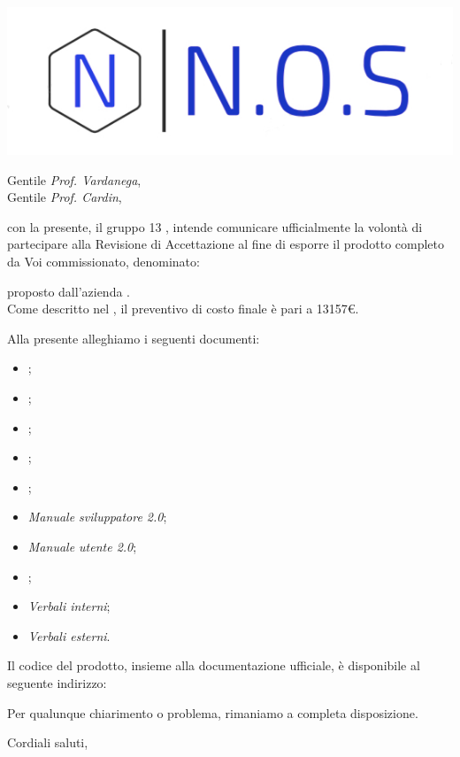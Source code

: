 \documentclass[12pt]{letter}
\date{26 maggio 2021}
\begin{document}
\begin{letter}{ }

\includegraphics[scale=1.5
]{../../../Immagini/N.O.S.jpg}

\opening{Gentile \textit{Prof. Vardanega},\\ Gentile \textit{Prof. Cardin},}

con la presente, il gruppo 13 {\Gruppo}, intende comunicare ufficialmente la volontà di partecipare alla Revisione di Accettazione al fine di esporre il prodotto completo da Voi commissionato, denominato:
\begin{center}
	\textbf{\NomeProgetto}
\end{center}
proposto dall'azienda \Proponente.\\
Come descritto nel , il preventivo di costo finale è pari a 13157\euro. 

Alla presente alleghiamo i seguenti documenti:

\begin{itemize}
	\item {};
	\item {};
	\item {};
	\item {};
	\item {};
	\item \textit{Manuale sviluppatore 2.0};
	\item \textit{Manuale utente 2.0};
	\item {};
	\item \textit{Verbali interni};
	\item \textit{Verbali esterni}.
\end{itemize}

Il codice del prodotto, insieme alla documentazione ufficiale, è disponibile al seguente indirizzo: \\


Per qualunque chiarimento o problema, rimaniamo a completa disposizione.
\closing{Cordiali saluti, }

\vspace{2em}

\end{letter}
\end{document}
